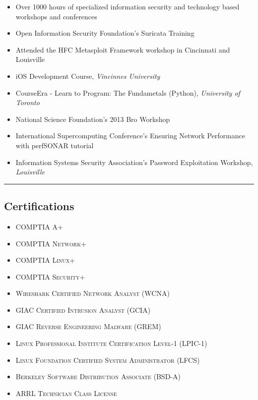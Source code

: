 \documentclass[10pt,letterpaper]{article}
\begin{document}
\begin{itemize}
	\parskip=0.1em
	\item Over 1000 hours of specialized information security and technology based workshops and conferences
        \item Open Information Security Foundation's Suricata Training
	\item Attended the HFC Metasploit Framework workshop in Cincinnati and Louisville
	\item iOS Development Course, \textit{Vincinnes University}
	\item CourseEra - Learn to Program: The Fundametals (Python), \textit{University of Toronto}
	\item National Science Foundation's 2013 Bro Workshop
	\item International Supercomputing Conference's Ensuring Network Performance with perfSONAR tutorial
	\item Information Systems Security Association's Password Exploitation Workshop, \textit{Louisville}
\end{itemize}

\hrule
\vspace{-0.4em}
\subsection*{Certifications}

\begin{itemize}
	\parskip=0.1em

	\item \textsc{COMPTIA A+}
	\item \textsc{COMPTIA Network+}
	\item \textsc{COMPTIA Linux+}
	\item \textsc{COMPTIA Security+}
	\item \textsc{Wireshark Certified Network Analyst (WCNA)}
	\item \textsc{GIAC Certified Intrusion Analyst (GCIA)}
	\item \textsc{GIAC Reverse Engineering Malware (GREM)}
	\item \textsc{Linux Professional Institute Certification Level-1 (LPIC-1)}
	\item \textsc{Linux Foundation Certified System Administrator (LFCS)}
	\item \textsc{Berkeley Software Distribution Associate (BSD-A)}
	\item \textsc{ARRL Technician Class License}

\end{itemize}
\end{document}
